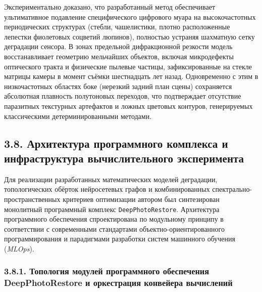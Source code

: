 \documentclass[12pt,a4paper]{article}
\begin{document}
Экспериментально доказано, что разработанный метод обеспечивает ультимативное подавление специфического цифрового муара на высокочастотных периодических структурах (стебли, чашелистики, плотно расположенные лепестки фиолетовых соцветий люпинов), полностью устраняя шахматную сетку деградации сенсора. В зонах предельной дифракционной резкости модель восстанавливает геометрию мельчайших объектов, включая микродефекты оптического тракта и физические пылевые частицы, зафиксированные на стекле матрицы камеры в момент съёмки шестнадцать лет назад. Одновременно с этим в низкочастотных областях боке (нерезкий задний план сцены) сохраняется абсолютная плавность полутоновых переходов, что подтверждает отсутствие паразитных текстурных артефактов и ложных цветовых контуров, генерируемых классическими детерминированными методами.


\subsection{3.8. Архитектура программного комплекса и инфраструктура вычислительного эксперимента}

Для реализации разработанных математических моделей деградации, топологических обёрток нейросетевых графов и комбинированных спектрально-пространственных критериев оптимизации автором был синтезирован монолитный программный комплекс \texttt{DeepPhotoRestore}. Архитектура программного обеспечения спроектирована по модульному принципу в соответствии с современными стандартами объектно-ориентированного программирования и парадигмами разработки систем машинного обучения (\textit{MLOps}).

\subsubsection{3.8.1. Топология модулей программного обеспечения DeepPhotoRestore и оркестрация конвейера вычислений}
\end{document}
